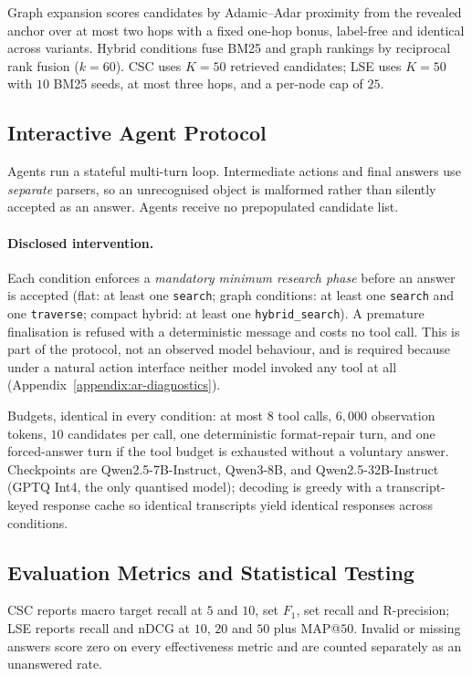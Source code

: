 Graph expansion scores candidates by Adamic--Adar proximity from the revealed anchor over at most
two hops with a fixed one-hop bonus, label-free and identical across variants. Hybrid conditions
fuse BM25 and graph rankings by reciprocal rank fusion ($k{=}60$). CSC uses $K{=}50$ retrieved
candidates; LSE uses $K{=}50$ with $10$ BM25 seeds, at most three hops, and a per-node cap of $25$.

\subsection{Interactive Agent Protocol}
\label{appendix:ar-protocol}

Agents run a stateful multi-turn loop. Intermediate actions and final answers use \emph{separate}
parsers, so an unrecognised object is malformed rather than silently accepted as an answer. Agents
receive no prepopulated candidate list.

\paragraph{Disclosed intervention.} Each condition enforces a \emph{mandatory minimum research
phase} before an answer is accepted (flat: at least one \texttt{search}; graph conditions: at least
one \texttt{search} and one \texttt{traverse}; compact hybrid: at least one \texttt{hybrid\_search}).
A premature finalisation is refused with a deterministic message and costs no tool call. This is
part of the protocol, not an observed model behaviour, and is required because under a natural
action interface neither model invoked any tool at all (Appendix~\ref{appendix:ar-diagnostics}).

Budgets, identical in every condition: at most $8$ tool calls, $6{,}000$ observation tokens,
$10$ candidates per call, one deterministic format-repair turn, and one forced-answer turn if the
tool budget is exhausted without a voluntary answer. Checkpoints are Qwen2.5-7B-Instruct,
Qwen3-8B, and Qwen2.5-32B-Instruct (GPTQ Int4, the only quantised model); decoding is greedy with
a transcript-keyed response cache so identical transcripts yield identical responses across
conditions.

\subsection{Evaluation Metrics and Statistical Testing}
\label{appendix:ar-stats}

CSC reports macro target recall at $5$ and $10$, set $F_1$, set recall and R-precision; LSE reports
recall and nDCG at $10$, $20$ and $50$ plus MAP@$50$. Invalid or missing answers score zero on every
effectiveness metric and are counted separately as an unanswered rate.

